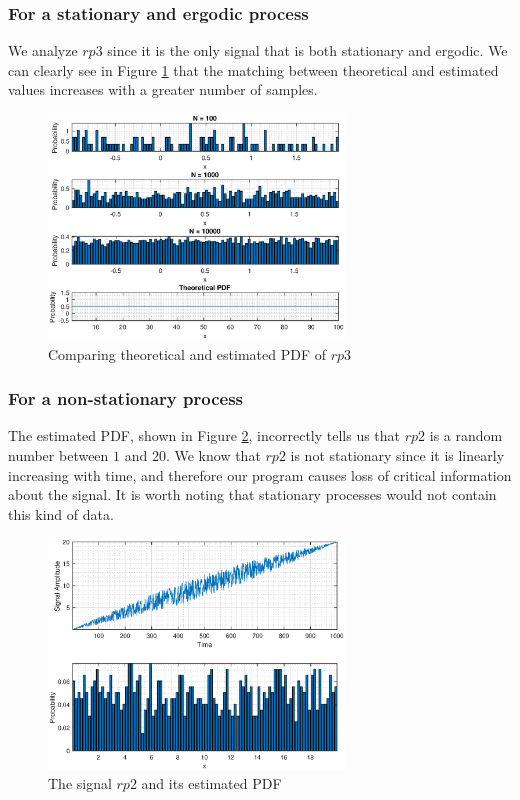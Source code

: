 \pagebreak


\subsubsection{For a stationary and ergodic process}

We analyze $rp3$ since it is the only signal that is both stationary and ergodic. We can clearly see in Figure \ref{fig:pdf_stat} that the matching between theoretical and estimated values increases with a greater number of samples.

\begin{figure}[h!]
\centering
\includegraphics[width=0.7\textwidth]{pdf_stat}
\caption{\label{fig:pdf_stat} Comparing theoretical and estimated PDF of $rp3$}
\end{figure}


\subsubsection{For a non-stationary process}

The estimated PDF, shown in Figure \ref{fig:pdf_nonstat}, incorrectly tells us that $rp2$ is a random number between $1$ and $20$. We know that $rp2$ is not stationary since it is linearly increasing with time, and therefore our program causes loss of critical information about the signal. It is worth noting that stationary processes would not contain this kind of data.

\begin{figure}[h!]
\centering
\includegraphics[width=0.7\textwidth]{pdf_nonstat}
\caption{\label{fig:pdf_nonstat} The signal $rp2$ and its estimated PDF}
\end{figure}


%